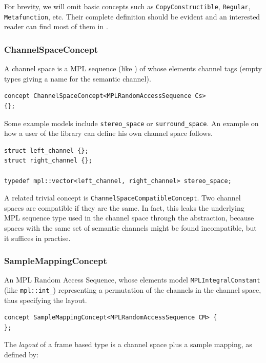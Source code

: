 For brevity, we will omit basic concepts such as
\texttt{Copy\-Constructible}, \texttt{Regular}, \texttt{Metafunction},
etc. Their complete definition should be evident and an interested
reader can find most of them in \cite{stepanov09elements}.

\subsubsection{{ChannelSpaceConcept}}

A channel space is a MPL sequence (like ) of whose
elements channel tags (empty types giving a name for the semantic
channel).

\begin{lstlisting}
concept ChannelSpaceConcept<MPLRandomAccessSequence Cs> 
{};
\end{lstlisting}

Some example models include \texttt{stereo\-\_space} or
\texttt{surround\-\_space}. An example on how a user of the library can
define his own channel space follows.

\begin{lstlisting}
struct left_channel {};
struct right_channel {};

typedef mpl::vector<left_channel, right_channel> stereo_space;
\end{lstlisting}

A related trivial concept is
\texttt{Channel\-Space\-Compatible\-Con\-cept}. Two channel spaces are
compatible if they are the same. In fact, this leaks the underlying
MPL sequence type used in the channel space through the abstraction,
because spaces with the same set of semantic channels might be found
incompatible, but it suffices in practise.

\subsubsection{{SampleMappingConcept}}

An MPL Random Access Sequence, whose elements model
\texttt{MPLIntegralConstant} (like \texttt{mpl::int\_}) representing a
permutation of the channels in the channel space, thus specifying the
layout.

\begin{lstlisting}
concept SampleMappingConcept<MPLRandomAccessSequence CM> {
};
\end{lstlisting}

The \emph{layout} of a frame based type is a channel space plus a
sample mapping, as defined by:

